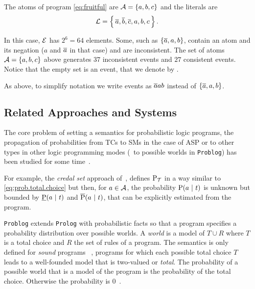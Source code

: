 \documentclass[x11names]{tlp}
\renewcommand{\cite}{\citep}
\begin{document}
\ifExamples
	\begin{example}\label{ex:events}\em

		The atoms of program \cref{eq:fruitful} are $\ATOMSset = \set{a, b, c}$ and
		the literals are
		\begin{equation*}
			\LITERALSset = \set{\, \co{a}, \co{b}, \co{c}, a, b, c\, }.
		\end{equation*}

		In this case, $\EVENTSset$ has $2^6 = 64$ elements.
Some, such as
		$\set{\ensuremath{\overline{a}}, a, b}$, contain an atom and its negation ($a$ and $\overline{a}$ in
		that case) and are inconsistent.
The set of atoms $\ATOMSset = \set{a, b, c}$
		above generates $37$ inconsistent events and $27$ consistent events.
Notice
		that the empty set is an event, that we denote by \emptyevent.

		As above, to simplify notation we write events as $\overline{a}ab$ instead of
		$\set{\ensuremath{\overline{a}}, a, b}$.
	\end{example}
\fi

\subsection*{Related Approaches and Systems}
\label{ssec:other.approaches}

The core problem of setting a semantics for probabilistic logic programs, the propagation of probabilities from \aclp{TC} to \aclp{SM} in the case of \ac{ASP} or to other types in other logic programming modes (\eg\ to possible worlds in \texttt{Problog}) has been studied for some time~\cite{kifer1992theory,sato1995statistical}.

For example, the \emph{credal set} approach of~\cite{cozman2020joy}, defines $\prT$ in a way similar to \cref{eq:prob.total.choice} but then, for $a \in \ATOMSset$, the probability $\pr{a \given t}$ is unknown but bounded by $\underbar{\prfunc}\at{a \given t}$ and $\overline{\prfunc}\at{a \given t}$, that can be explicitly estimated from the program.

\texttt{Problog} \cite{fierens2015inference,verreet2022inference} extends \texttt{Prolog} with probabilistic facts so that a program specifies a probability distribution over possible worlds.
A \textit{world} is a model of $T \cup R$ where $T$ is a total choice and $R$ the set of rules of a program.
The semantics is only defined for \textit{sound} programs~\cite{riguzzi2013well} \ie, programs for which each possible total choice $T$ leads to a well-founded model that is two-valued or \textit{total}.
The probability of a possible world that is a model of the program is the probability of the total choice.
Otherwise the probability is $0$~\cite{riguzzi2013well,van1991well}.
\end{document}
